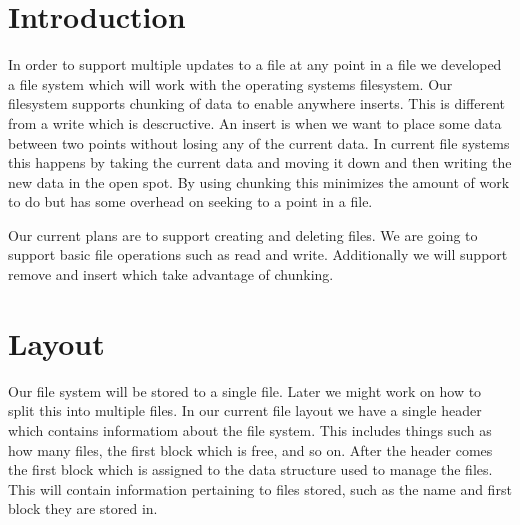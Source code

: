 \documentclass{article}
\begin{document}
\section*{Introduction}

In order to support multiple updates to a file at any point in a file we
developed a file system which will work with the operating systems filesystem.
Our filesystem supports chunking of data to enable anywhere inserts.
This is different from a write which is descructive.
An insert is when we want to place some data between two points without losing any of the current data.
In current file systems this happens by taking the current data and moving it down and then writing the new data in the open spot.
By using chunking this minimizes the amount of work to do but has some overhead on seeking to a point in a file.

Our current plans are to support creating and deleting files.
We are going to support basic file operations such as read and write.
Additionally we will support remove and insert which take advantage of chunking.


\section*{Layout}

Our file system will be stored to a single file.
Later we might work on how to split this into multiple files.
In our current file layout we have a single header which contains informatiom about the file system.
This includes things such as how many files, the first block which is free, and so on.
After the header comes the first block which is assigned to the data structure used to manage the files.
This will contain information pertaining to files stored, such as the name and first block they are stored in.
\end{document}
